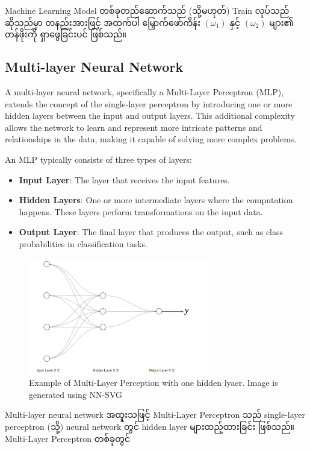 Machine Learning Model တစ်ခုတည်ဆောက်သည် (သို့မဟုတ်) Train လုပ်သည် ဆိုသည်မှာ တနည်းအားဖြင့် အထက်ပါ မြှောက်ဖော်ကိန်း  $(\omega_1)$ နှင့် $(\omega_2)$ များ၏ တန်ဖိုးကို ရှာဖွေခြင်းပင် ဖြစ်သည်။ 

\subsection{Multi-layer Neural Network}\label{MLP}

A multi-layer neural network, specifically a Multi-Layer Perceptron (MLP), extends the concept of the single-layer perceptron by introducing one or more hidden layers between the input and output layers. This additional complexity allows the network to learn and represent more intricate patterns and relationships in the data, making it capable of solving more complex problems.

\noindent An MLP typically consists of three types of layers:
\begin{itemize}
  \item \textbf{Input Layer}: The layer that receives the input features.
  \item \textbf{Hidden Layers}: One or more intermediate layers where the computation happens. These layers perform transformations on the input data.
  \item \textbf{Output Layer}: The final layer that produces the output, such as class probabilities in classification tasks.
\end{itemize}

\begin{figure}[h]%
\centering
\includegraphics[width=0.7\textwidth]{imgs/mlp.png}
\caption{Example of Multi-Layer Perception with one hidden lyaer. Image is generated using NN-SVG\cite{web:NNSVG}}\label{fig:mlp}
\end{figure}

\vspace{0.25em}
\noindent Multi-layer neural network အထူးသဖြင့် Multi-Layer Perceptron သည်  single-layer perceptron (သို့) neural network တွင် hidden layer များထည့်ထားခြင်း ဖြစ်သည်။ Multi-Layer Perceptron တစ်ခုတွင် 

